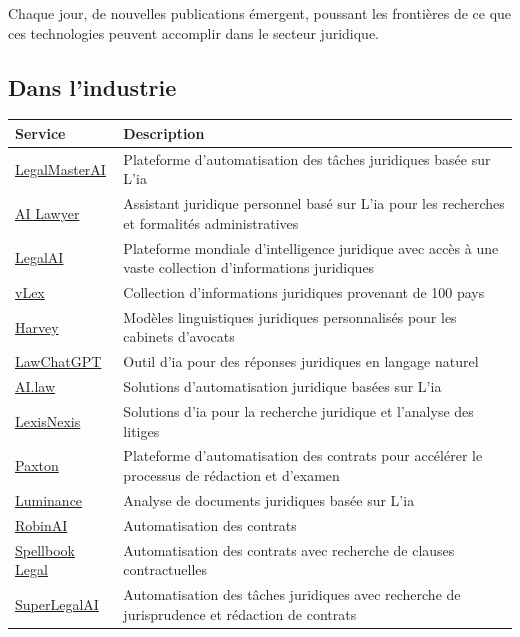 Chaque jour, de nouvelles publications émergent, poussant les frontières de ce que ces technologies peuvent accomplir dans le secteur juridique.

\newpage
\subsection{Dans l'industrie}

\begin{table}[h]
    \centering
    \begin{tabular}{|l|p{12cm}|}
        \hline
        \textbf{Service} & \textbf{Description} \\
        \hline
        \href{https://legalmasterai.com/}{LegalMasterAI} & Plateforme d'automatisation des tâches juridiques basée sur L'\ac{ia} \\
        \hline
        \href{https://ailawyer.pro/fr}{AI Lawyer} & Assistant juridique personnel basé sur L'\ac{ia} pour les recherches et formalités administratives \\
        \hline
        \href{https://www.legalai.io/}{LegalAI} & Plateforme mondiale d'intelligence juridique avec accès à une vaste collection d'informations juridiques \\
        \hline
        \href{https://vlex.com/}{vLex} & Collection d'informations juridiques provenant de 100 pays \\
        \hline
        \href{https://www.harvey.ai/}{Harvey} & Modèles linguistiques juridiques personnalisés pour les cabinets d'avocats \\
        \hline
        \href{https://lawchatgpt.com/}{LawChatGPT} & Outil d'\ac{ia} pour des réponses juridiques en langage naturel \\
        \hline
        \href{https://www.ai.law/}{AI.law} & Solutions d'automatisation juridique basées sur L'\ac{ia} \\
        \hline
        \href{https://www.lexisnexis.com/en-us/products/lexis-plus-ai.page}{LexisNexis} & Solutions d'\ac{ia} pour la recherche juridique et l'analyse des litiges \\
        \hline
        \href{https://www.paxton.ai/}{Paxton} & Plateforme d'automatisation des contrats pour accélérer le processus de rédaction et d'examen \\
        \hline
        \href{https://www.luminance.com/}{Luminance} & Analyse de documents juridiques basée sur L'\ac{ia} \\
        \hline
        \href{https://www.robinai.com/}{RobinAI} & Automatisation des contrats \\
        \hline
        \href{https://www.spellbook.legal/}{Spellbook Legal} & Automatisation des contrats avec recherche de clauses contractuelles \\
        \hline
        \href{https://www.superlegal.ai/}{SuperLegalAI} & Automatisation des tâches juridiques avec recherche de jurisprudence et rédaction de contrats \\
        \hline
    \end{tabular}


\end{table}
